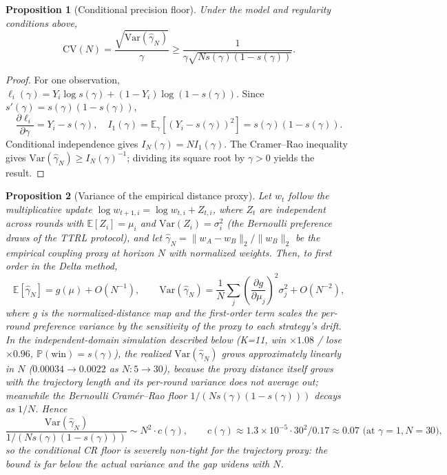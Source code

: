 \documentclass[11pt]{article}
\newtheorem{proposition}{Proposition}
\begin{document}
\begin{proposition}[Conditional precision floor]\label{thm:coupling-precision}
Under the model and regularity conditions above,
\[
\mathrm{CV}(N)=\frac{\sqrt{\mathrm{Var}(\hat\gamma_N)}}{\gamma}
\geq \frac{1}{\gamma\sqrt{N s(\gamma)(1-s(\gamma))}}.
\]
\end{proposition}

\begin{proof}
For one observation, $\ell_i(\gamma)=Y_i\log s(\gamma)+(1-Y_i)\log(1-s(\gamma))$. Since $s'(\gamma)=s(\gamma)(1-s(\gamma))$,
\[
\frac{\partial\ell_i}{\partial\gamma}=Y_i-s(\gamma),
\quad I_1(\gamma)=\mathbb{E}_\gamma[(Y_i-s(\gamma))^2]=s(\gamma)(1-s(\gamma)).
\]
Conditional independence gives $I_N(\gamma)=NI_1(\gamma)$. The Cramer--Rao inequality gives $\mathrm{Var}(\hat\gamma_N)\ge I_N(\gamma)^{-1}$; dividing its square root by $\gamma>0$ yields the result.
\end{proof}

\begin{proposition}[Variance of the empirical distance proxy]\label{thm:proxy-var}
Let $w_t$ follow the multiplicative update $\log w_{t+1,i}=\log w_{t,i}+Z_{t,i}$, where $Z_t$ are independent across rounds with $\mathbb{E}[Z_i]=\mu_i$ and $\mathrm{Var}(Z_i)=\sigma_i^2$ (the Bernoulli preference draws of the TTRL protocol), and let $\hat\gamma_N=\|w_A-w_B\|_2/\|w_B\|_2$ be the empirical coupling proxy at horizon $N$ with normalized weights. Then, to first order in the Delta method,
\begin{equation}
\mathbb{E}[\hat\gamma_N] = g(\mu)+O(N^{-1}), \qquad
\mathrm{Var}(\hat\gamma_N) = \frac{1}{N}\sum_j \left(\frac{\partial g}{\partial \mu_j}\right)^2 \sigma_j^2 + O(N^{-2}),
\end{equation}
where $g$ is the normalized-distance map and the first-order term scales the per-round preference variance by the sensitivity of the proxy to each strategy's drift. In the independent-domain simulation described below (K{=}11, win $\times1.08$ / lose $\times0.96$, $\mathbb{P}(\text{win})=s(\gamma)$), the realized $\mathrm{Var}(\hat\gamma_N)$ grows approximately linearly in $N$ ($0.00034 \to 0.0022$ as $N{:}5{\to}30$), because the proxy distance itself grows with the trajectory length and its per-round variance does not average out; meanwhile the Bernoulli Cram\'{e}r--Rao floor $1/(N s(\gamma)(1-s(\gamma)))$ decays as $1/N$. Hence
\begin{equation}
\frac{\mathrm{Var}(\hat\gamma_N)}{1/(N s(\gamma)(1-s(\gamma)))} \sim N^2 \cdot c(\gamma), \qquad c(\gamma)\approx 1.3\times10^{-5}\cdot 30^2/0.17 \approx 0.07 \text{ (at }\gamma{=}1, N{=}30),
\end{equation}
so the conditional CR floor is severely non-tight for the trajectory proxy: the bound is far below the actual variance and the gap widens with $N$.
\end{proposition}
\end{document}
